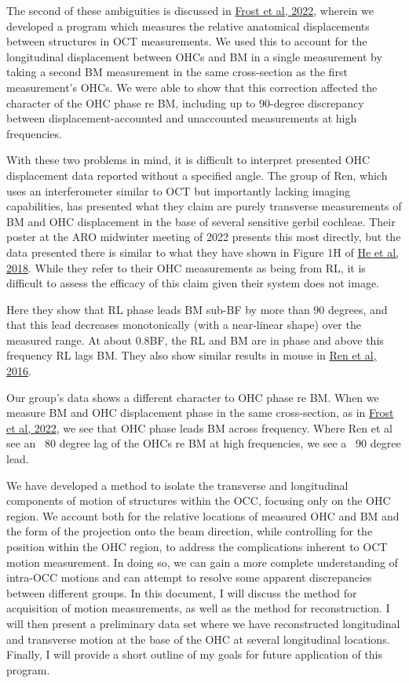 \documentclass{article}
\begin{document}
\par{The second of these ambiguities is discussed in \href{https://asa.scitation.org/doi/full/10.1121/10.0009576}{Frost et al, 2022}, wherein we developed a program which measures the relative anatomical displacements between structures in OCT measurements. We used this to account for the longitudinal displacement between OHCs and BM in a single measurement by taking a second BM measurement in the same cross-section as the first measurement's OHCs. We were able to show that this correction affected the character of the OHC phase re BM, including up to 90-degree discrepancy between displacement-accounted and unaccounted measurements at high frequencies.}
\par{With these two problems in mind, it is difficult to interpret presented OHC displacement data reported without a specified angle. The group of Ren, which uses an interferometer similar to OCT but importantly lacking imaging capabilities, has presented what they claim are purely transverse measurements of BM and OHC displacement in the base of several sensitive gerbil cochleae. Their poster at the ARO midwinter meeting of 2022 presents this most directly, but the data presented there is similar to what they have shown in Figure 1H of \href{https://elifesciences.org/articles/37625}{He et al, 2018}. While they refer to their OHC measurements as being from RL, it is difficult to assess the efficacy of this claim given their system does not image.}
\par{Here they show that RL phase leads BM sub-BF by more than 90 degrees, and that this lead decreases monotonically (with a near-linear shape) over the measured range. At about 0.8BF, the RL and BM are in phase and above this frequency RL lags BM. They also show similar results in mouse in \href{https://www.pnas.org/doi/10.1073/pnas.1607428113}{Ren et al, 2016}.}
\par{Our group's data shows a different character to OHC phase re BM. When we measure BM and OHC displacement phase in the same cross-section, as in \href{https://asa.scitation.org/doi/full/10.1121/10.0009576}{Frost et al, 2022}, we see that OHC phase leads BM across frequency. Where Ren et al see an ~80 degree lag of the OHCs re BM at high frequencies, we see a ~90 degree lead. }
\par{We have developed a method to isolate the transverse and longitudinal components of motion of structures within the OCC, focusing only on the OHC region. We account both for the relative locations of measured OHC and BM and the form of the projection onto the beam direction, while controlling for the position within the OHC region, to address the complications inherent to OCT motion measurement. In doing so, we can gain a more complete understanding of intra-OCC motions and can attempt to resolve some apparent discrepancies between different groups. In this document, I will discuss the method for acquisition of motion measurements, as well as the method for reconstruction. I will then present a preliminary data set where we have reconstructed longitudinal and transverse motion at the base of the OHC at several longitudinal locations. Finally, I will provide a short outline of my goals for future application of this program.}
\end{document}
